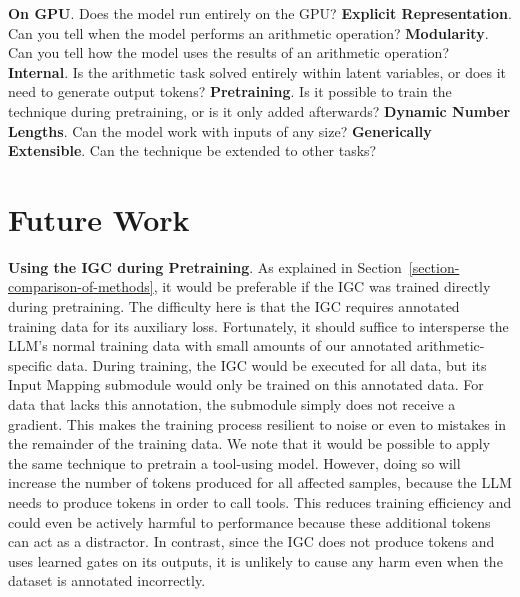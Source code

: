 \documentclass[11pt]{article}
\begin{document}
\begin{table}
{    \textbf{On GPU}. Does the model run entirely on the GPU?
    \textbf{Explicit Representation}. Can you tell when the model performs an arithmetic operation?
    \textbf{Modularity}. Can you tell how the model uses the results of an arithmetic operation?
    \textbf{Internal}. Is the arithmetic task solved entirely within latent variables, or does it need to generate output tokens?
    \textbf{Pretraining}. Is it possible to train the technique during pretraining, or is it only added afterwards?
    \textbf{Dynamic Number Lengths}. Can the model work with inputs of any size?
    \textbf{Generically Extensible}. Can the technique be extended to other tasks?
    }
    \label{tab:comparison_of_traits}
\end{table}



\section{Future Work}
\label{section-future-work}



\textbf{Using the IGC during Pretraining}.
As explained in Section~\ref{section-comparison-of-methods}, it would be preferable if the IGC was trained directly during pretraining.
The difficulty here is that the IGC requires annotated training data for its auxiliary loss.
Fortunately, it should suffice to intersperse the LLM's normal training data with small amounts of our annotated arithmetic-specific data. During training, the IGC would be executed for all data, but its Input Mapping submodule would only be trained on this annotated data. For data that lacks this annotation, the submodule simply does not receive a gradient.
This makes the training process resilient to noise or even to mistakes in the remainder of the training data.
We note that it would be possible to apply the same technique to pretrain a tool-using model. However, doing so will increase the number of tokens produced for all affected samples, because the LLM needs to produce tokens in order to call tools. This reduces training efficiency and could even be actively harmful to performance because these additional tokens can act as a distractor. In contrast, since the IGC does not produce tokens and uses learned gates on its outputs, it is unlikely to cause any harm even when the dataset is annotated incorrectly.
\end{document}
